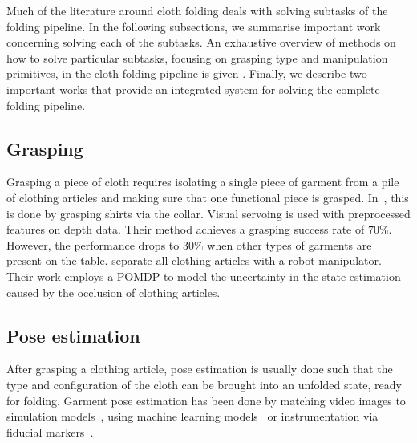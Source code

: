 Much of the literature around cloth folding deals with solving subtasks of the folding pipeline. In the following subsections, we summarise important work concerning solving each of the subtasks. An exhaustive overview of methods on how to solve particular subtasks, focusing on grasping type and manipulation primitives, in the cloth folding pipeline is given \autocite{Borras2020}. Finally, we describe two important works that provide an integrated system for solving the complete folding pipeline.

\subsection{Grasping}
Grasping a piece of cloth requires isolating a single piece of garment from a pile of clothing articles and making sure that one functional piece is grasped. In~\autocite{Ramisa2012}, this is done by grasping shirts via the collar. Visual servoing is used with preprocessed features on depth data. Their method achieves a grasping success rate of $70\%$. However, the performance drops to $30\%$ when other types of garments are present on the table. \Textcite{Monso2012} separate all clothing articles with a robot manipulator. Their work employs a \acrshort{POMDP} to model the uncertainty in the state estimation caused by the occlusion of clothing articles.

\subsection{Pose estimation}
After grasping a clothing article, pose estimation is usually done such that the type and configuration of the cloth can be brought into an unfolded state, ready for folding. Garment pose estimation has been done by matching video images to simulation models~\autocite{Kita2002}, using machine learning models~\autocite{Li2014, li2014volum} or instrumentation via fiducial markers~\autocite{Bersch2011}.

